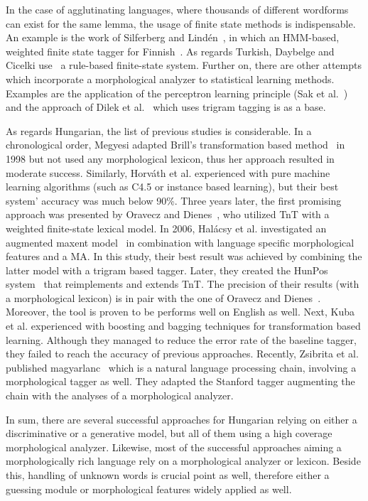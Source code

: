 In the case of agglutinating languages, where thousands of different wordforms can exist for the same lemma, the usage of finite state methods is indispensable.
An example is the work of Silferberg and Lindén~\cite{}, in which an HMM-based, weighted finite state tagger for Finnish~\cite{}.
As regards Turkish, Daybelge and Cicelki use~\cite{} a rule-based finite-state system.
Further on, there are other attempts which incorporate a morphological analyzer to statistical learning methods.
Examples are the application of the perceptron learning principle (Sak et al.~\cite{}) and the approach of Dilek et al.~\cite{} which uses trigram tagging is as a base.

As regards Hungarian, the list of previous studies is considerable.
In a chronological order, Megyesi adapted Brill’s transformation based method~\cite{} in 1998 but not used any morphological lexicon, thus her approach resulted in moderate success.
Similarly, Horváth et al. experienced with pure machine learning algorithms (such as C4.5 or instance based learning), but their best system’ accuracy was much below 90\%.
Three years later, the first promising approach was presented by Oravecz and Dienes~\cite{}, who utilized TnT with a weighted finite-state lexical model.
In 2006, Halácsy et al. investigated an augmented maxent model~\cite{} in combination with language specific morphological features and a MA.
In this study, their best result was achieved by combining the latter model with a trigram based tagger.
Later, they created the HunPos system~\cite{} that reimplements and extends TnT.
The precision of their results (with a morphological lexicon) is in pair with the one of Oravecz and Dienes~\cite{}.
Moreover, the tool is proven to be performs well on English as well.
Next, Kuba et al. experienced with boosting and bagging techniques for transformation based learning.
Although they managed to reduce the error rate of the baseline tagger, they failed to reach the accuracy of previous approaches.
Recently, Zsibrita et al. published magyarlanc~\cite{} which is a natural language processing chain, involving a morphological tagger as well.
They adapted the Stanford tagger augmenting the chain with the analyses of a morphological analyzer. 

In sum, there are several successful approaches for Hungarian relying on either a discriminative or a generative model, but all of them using a high coverage morphological analyzer.
Likewise, most of the successful approaches aiming a morphologically rich language rely on a morphological analyzer or lexicon.
Beside this, handling of unknown words is crucial point as well, therefore either a guessing module or morphological features widely applied as well. 

